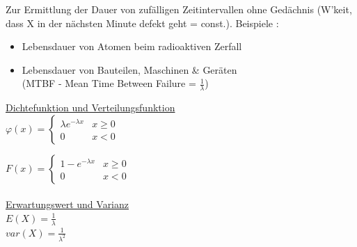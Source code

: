 		Zur Ermittlung der Dauer von zufälligen Zeitintervallen ohne Gedächnis
		(W'keit, dass X in der nächsten Minute defekt geht = const.). Beispiele :
		\begin{itemize}
          \item Lebensdauer von Atomen beim radioaktiven Zerfall
          \item Lebensdauer von Bauteilen, Maschinen \& Geräten\\(MTBF -
          Mean Time Between Failure = $\frac{1}{\lambda}$)
        \end{itemize}
        
		\underline{Dichtefunktion und Verteilungsfunktion}\\
        $\varphi(x)=\begin{cases}
		\lambda e^{-\lambda x}  & x \geq 0\\
  		0						& x < 0
		\end{cases}$
		
		$F(x)=\begin{cases}
  		1-e^{-\lambda x}  		& x \geq 0\\
  		0	 					& x < 0
		\end{cases}$\\ \\

		\underline{Erwartungswert und Varianz}\\
		$E(X)=\frac{1}{\lambda}$\\
		$var(X)=\frac{1}{\lambda^2}$ \\
		
		
\newpage

